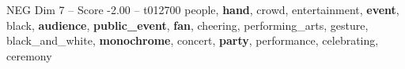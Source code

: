\begin{textsample}{NEG Dim 7 – Score -2.00 – t012700}  \label{ex:f7_neg_001}
people, \textbf{hand}, crowd, entertainment, \textbf{event}, black, \textbf{audience}, \textbf{public\_event}, \textbf{fan}, cheering, performing\_arts, gesture, black\_and\_white, \textbf{monochrome}, concert, \textbf{party}, performance, celebrating, ceremony

\end{textsample}
